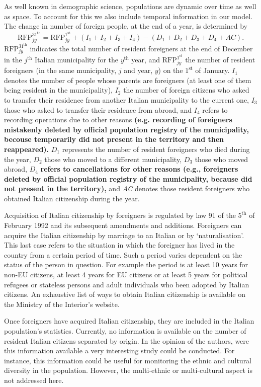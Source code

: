 \documentclass[10pt] {article}
\theoremstyle{definition}
\theoremstyle{plain}
\begin{document}
As well known in demographic science, populations are dynamic over time as well as space. To account for this we also include temporal information in our model. The change in number of foreign people, at the end of a year, is determined by
$$
\text{RFP}^{31^\text{th}}_{jy} = \text{RFP}^{1^\text{st}}_{jy} + (I_1 + I_2 + I_3+ I_4) - (D_1 + D_2 + D_3 + D_4 + AC).
$$ 
$\text{RFP}^{31^\text{th}}_{jy}$ indicates the total number of resident foreigners at the end of December in the $j^\text{th}$ Italian municipality for the $y^\text{th}$ year, and $\text{RFP}^{1^\text{st}}_{jy}$ the number of resident foreigners (in the same municipality, $j$ and year, $y$) on the $1^\text{st}$ of January. $I_{1}$ denotes the number of people whose parents are foreigners (at least one of them being resident in the municipality), $I_{2}$ the number of foreign citizens who asked to transfer their residence from another Italian municipality to the current one, $I_{3}$ those who asked to transfer their residence from abroad, and $I_{4}$ refers to recording operations due to other reasons \textbf{(e.g. recording of  foreigners mistakenly deleted by official population registry of the municipality, becouse temporarily did not present in the territory and then reappeared).} $D_{1}$ represents the number of resident foreigners who died during the year, $D_{2}$ those who moved to a different municipality, $D_{3}$ those who moved abroad, $D_{4}$ \textbf{refers to cancellations for other reasons (e.g., foreigners deleted by official population registry of the municipality, because did not present in the territory),} and \textit{AC} denotes those resident foreigners who obtained Italian citizenship during the year. 

Acquisition of Italian citizenship by foreigners is regulated by law 91 of the $5^\text{th}$ of February 1992 and its subsequent amendments and additions. Foreigners can acquire the Italian citizenship by marriage to an Italian or by `naturalisation'. This last case refers to the situation in which the foreigner has lived in the country from a certain period of time. Such a period varies dependent on the status of the person in question. For example the period is at least 10 years for non-EU citizens, at least 4 years for EU citizens or at least 5 years for political refugees or stateless persons and adult individuals who been adopted by Italian citizens. An exhaustive list of ways to obtain Italian citizenship is available on the Ministry of the Interior's website.

Once foreigners have acquired Italian citizenship, they are included in the Italian population's statistics. Currently, no information is available on the number of resident Italian citizens separated by origin. In the opinion of the authors, were this information available a very interesting study could be conducted. For instance, this information could be useful for monitoring the ethnic and cultural diversity in the population. However, the multi-ethnic or multi-cultural aspect is not addressed here.
\end{document}
